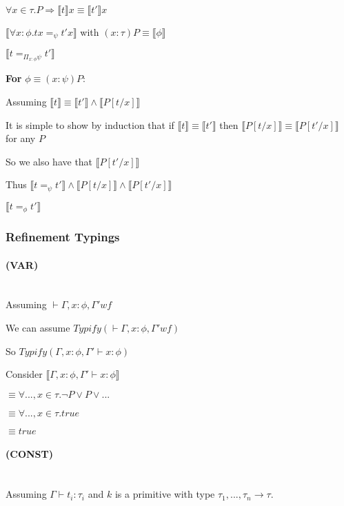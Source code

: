 \documentclass[12pt,a4paper,titlepage]{article}
\newcommand{\typify}{\textit{Typify}}
\newcommand{\bbrackets}[1]{\llbracket #1 \rrbracket}
\begin{document}
    $\forall x \in \tau . P \Rightarrow \bbrackets{t} x \equiv \bbrackets{t'} x$

    $\bbrackets{\forall x : \phi . tx =_\psi t'x}$ with $(x: \tau)P \equiv \bbrackets{\phi}$

    $\bbrackets{t =_{\Pi_{x: \phi} \psi} t'}$

    \textbf{For} $\phi \equiv (x: \psi)P$:

    Assuming $\bbrackets{t} \equiv \bbrackets{t'} \land \bbrackets{P[t / x]}$

    It is simple to show by induction that if $\bbrackets{t} \equiv \bbrackets{t'}$ then $\bbrackets{P[t/x]} \equiv \bbrackets{P[t'/x]}$ for any $P$

    So we also have that $\bbrackets{P[t'/x]}$

    Thus $\bbrackets{t =_\psi t'} \land \bbrackets{P[t/x]} \land \bbrackets{P[t'/x]}$

    $\bbrackets{t =_\phi t'}$

    \subsubsection{Refinement Typings}

    \paragraph{(VAR)}\mbox{}\\

    Assuming $\vdash \Gamma, x: \phi, \Gamma' wf$

    We can assume $\typify (\vdash \Gamma, x: \phi, \Gamma' wf)$

    So $\typify (\Gamma, x: \phi, \Gamma' \vdash x: \phi)$

    Consider $\bbrackets{\Gamma, x: \phi, \Gamma' \vdash x: \phi}$

    $\equiv \forall ..., x \in \tau . \neg P \lor P \lor ...$

    $\equiv \forall ..., x \in \tau . true$

    $\equiv true$

    \paragraph{(CONST)}\mbox{}\\

    Assuming $\Gamma \vdash t_i : \tau_i$ and $k$ is a primitive with type $\tau_1, ..., \tau_n \rightarrow \tau$.
\end{document}
